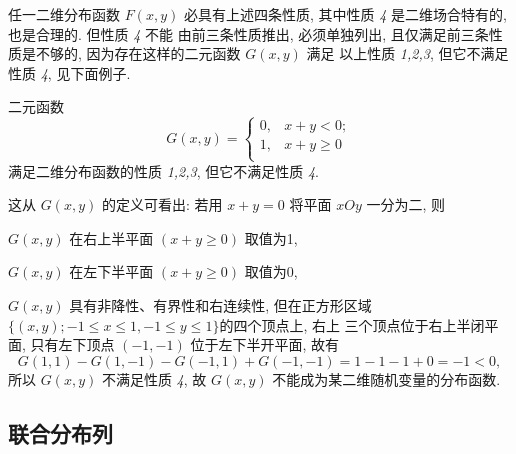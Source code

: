    任一二维分布函数 $F(x,y)$ 必具有上述四条性质, 其中性质 \textit{4} 是二维场合特有的, 也是合理的. 但性质 \textit{4} 不能
   由前三条性质推出, 必须单独列出, 且仅满足前三条性质是不够的, 因为存在这样的二元函数 $G(x,y)$ 满足
   以上性质 \textit{1,2,3}, 但它不满足性质 \textit{4}, 见下面例子.

   \begin{example}\label{exam:3.1.1}
   	二元函数
   	\[
   	 	G(x,y)=\begin{cases}
   	 		0,	& x+y<0;\\
   	 		1,	& x+y\geq 0 \\
   	 	\end{cases}
   	\]
   	满足二维分布函数的性质 \textit{1,2,3}, 但它不满足性质 \textit{4}.

    这从 $G(x,y)$ 的定义可看出: 若用 $x+y=0$ 将平面 $xOy$ 一分为二, 则
 
    $G(x,y)$ 在右上半平面 $(x+y\geq 0)$ 取值为1, 
   
    $G(x,y)$ 在左下半平面 $(x+y\geq 0)$ 取值为0, 

    $G(x,y)$ 具有非降性、有界性和右连续性, 但在正方形区域 $\{(x,y); -1\leq x\leq 1,-1\leq y\leq 1\}$的四个顶点上, 右上
    三个顶点位于右上半闭平面, 只有左下顶点 $(-1,-1)$ 位于左下半开平面, 故有
    \[
     	G(1,1)-G(1,-1)-G(-1,1)+G(-1,-1)=1-1-1+0=-1<0,
    \]
	所以 $G(x,y)$ 不满足性质 \textit{4}, 故 $G(x,y)$ 不能成为某二维随机变量的分布函数.
   \end{example}

   \subsection{联合分布列}\label{ssec:3.1.3}

